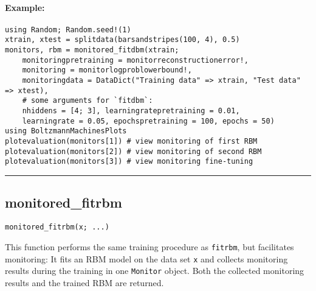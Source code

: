 \paragraph*{Example:}
\begin{verbatim}
using Random; Random.seed!(1)
xtrain, xtest = splitdata(barsandstripes(100, 4), 0.5)
monitors, rbm = monitored_fitdbm(xtrain;
    monitoringpretraining = monitorreconstructionerror!,
    monitoring = monitorlogproblowerbound!,
    monitoringdata = DataDict("Training data" => xtrain, "Test data" => xtest),
    # some arguments for `fitdbm`:
    nhiddens = [4; 3], learningratepretraining = 0.01,
    learningrate = 0.05, epochspretraining = 100, epochs = 50)
using BoltzmannMachinesPlots
plotevaluation(monitors[1]) # view monitoring of first RBM
plotevaluation(monitors[2]) # view monitoring of second RBM
plotevaluation(monitors[3]) # view monitoring fine-tuning
\end{verbatim}
\noindent\rule{\textwidth}{1pt}
\subsection*{monitored\_fitrbm}  \label{bms_monitored_fitrbm}
\begin{verbatim}
monitored_fitrbm(x; ...)
\end{verbatim}
This function performs the same training procedure as \texttt{fitrbm}, but facilitates monitoring: It fits an RBM model on the data set \texttt{x} and collects monitoring results during the training in one \texttt{Monitor} object. Both the collected monitoring results and the trained RBM are returned.

